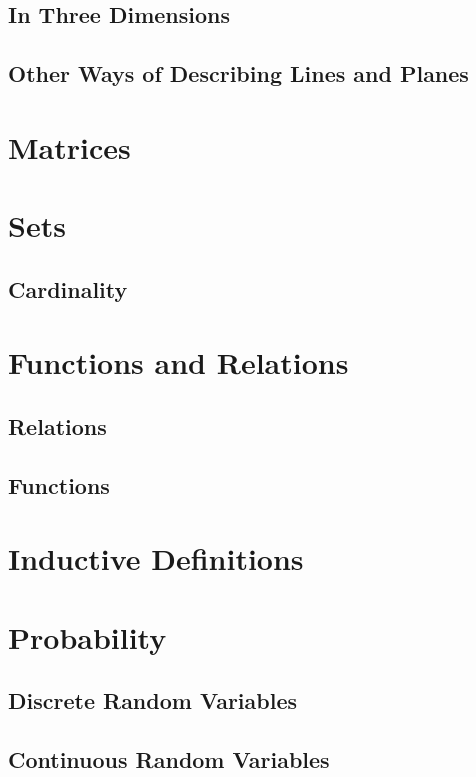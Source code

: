 \documentclass{article}
\begin{document}
	\subsection{In Three Dimensions}
	\subsection{Other Ways of Describing Lines and Planes}
	
	\section{Matrices}
	
	\section{Sets}
	\subsection{Cardinality}

	\section{Functions and Relations}
	\subsection{Relations}
	\subsection{Functions}
	
	\section{Inductive Definitions}
	
	\section{Probability}
	\subsection{Discrete Random Variables}
	\subsection{Continuous Random Variables}
	
	\newpage
	\printindex
\end{document}
